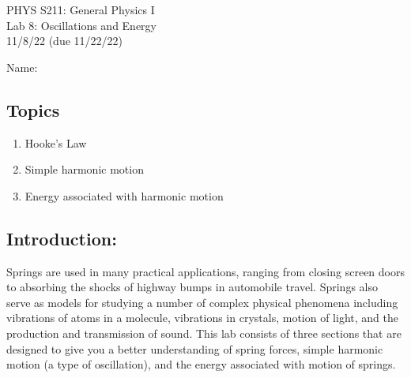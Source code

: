 \documentclass[11pt,letterpaper]{article}
\begin{document}
\setlength{\parindent}{0in}


\begin{flushright}
PHYS S211: General Physics I\\
Lab 8: Oscillations and Energy\\
11/8/22 (due 11/22/22)
\end{flushright}

Name:

\subsection*{Topics}
\begin{enumerate}
\setlength{\parskip}{3pt}
\item Hooke's Law
\item Simple harmonic motion
\item Energy associated with harmonic motion
\end{enumerate}

\subsection*{Introduction:}
Springs are used in many practical applications, ranging from closing screen doors to absorbing the shocks of highway bumps in automobile travel. Springs also serve as models for studying a number of complex physical phenomena including vibrations of atoms in a molecule, vibrations in crystals, motion of light, and the production and transmission of sound.  This lab consists of three sections that are designed to give you a better understanding of spring forces, simple harmonic motion (a type of oscillation), and the energy associated with motion of springs.
\end{document}
